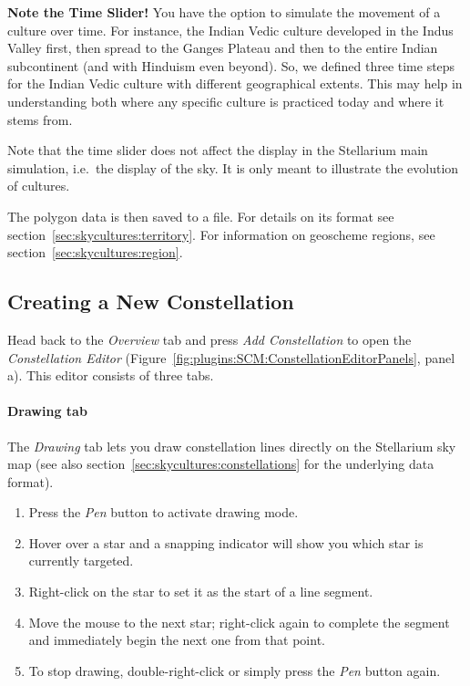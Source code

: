 \noindent\textbf{Note the Time Slider!}
You have the option to simulate the movement of a culture over time.
For instance, the Indian Vedic culture developed in the Indus Valley first, then spread to the Ganges Plateau and then to the entire Indian subcontinent (and with Hinduism even beyond).
So, we defined three time steps for the Indian Vedic culture with different geographical extents.
This may help in understanding both where any specific culture is practiced today and where it stems from.

\noindent Note that the time slider does not affect the display in the Stellarium main simulation, i.e.\ the display of the sky.
It is only meant to illustrate the evolution of cultures.

The polygon data is then saved to a  file.
For details on its format see section~\ref{sec:skycultures:territory}.
For information on geoscheme regions, see section~\ref{sec:skycultures:region}.

\subsection{Creating a New Constellation}
\label{sec:plugins:SCM:CreatingConstellation}

Head back to the \textit{Overview} tab and press \textit{Add Constellation} to open the \textit{Constellation Editor} (Figure~\ref{fig:plugins:SCM:ConstellationEditorPanels}, panel a). 
This editor consists of three tabs. 


\paragraph{Drawing tab}
The \textit{Drawing} tab lets you draw constellation lines directly on the Stellarium sky map (see also section~\ref{sec:skycultures:constellations} for the underlying data format).

\begin{enumerate}
\item Press the \textit{Pen} button to activate drawing mode.
\item Hover over a star and a snapping indicator will show you which star is currently targeted.
\item Right-click on the star to set it as the start of a line segment.
\item Move the mouse to the next star; right-click again to complete the segment and immediately begin the next one from that point.
\item To stop drawing, double-right-click or simply press the \textit{Pen} button again.
\end{enumerate}

